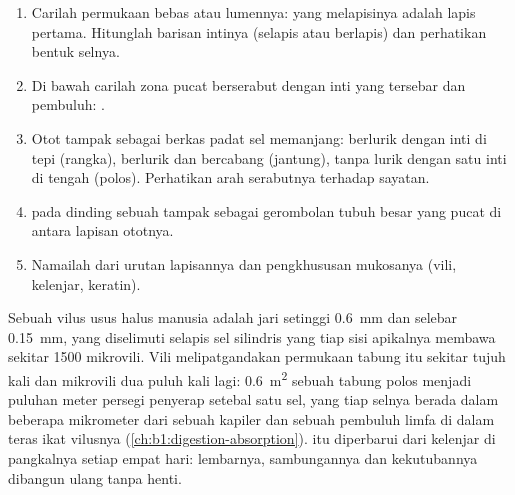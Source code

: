 \begin{method}\label{met:b1:body-plans-tissues:histology}
\begin{enumerate}
  \item Carilah permukaan bebas atau lumennya:  yang melapisinya
        adalah lapis pertama. Hitunglah barisan intinya (selapis atau
        berlapis) dan perhatikan bentuk selnya.
  \item Di bawah  carilah zona pucat berserabut dengan inti yang
        tersebar dan pembuluh: .
  \item Otot tampak sebagai berkas padat sel memanjang: berlurik dengan
        inti di tepi (rangka), berlurik dan bercabang (jantung), tanpa
        lurik dengan satu inti di tengah (polos). Perhatikan arah
        serabutnya terhadap sayatan.
  \item {} pada dinding sebuah  tampak sebagai
        gerombolan tubuh  besar yang pucat di antara lapisan
        ototnya.
  \item Namailah  dari urutan lapisannya dan pengkhususan
        mukosanya (vili, kelenjar, keratin).
\end{enumerate}
\end{method}

\begin{example}\label{ex:b1:body-plans-tissues:villus}
Sebuah vilus usus halus manusia adalah jari setinggi \qty{0.6}{mm} dan
selebar \qty{0.15}{mm}, yang diselimuti selapis sel silindris yang tiap
sisi apikalnya membawa sekitar \qty{1500}{} mikrovili. Vili
melipatgandakan permukaan tabung itu sekitar tujuh kali dan mikrovili
dua puluh kali lagi: \qty{0.6}{m^2} sebuah tabung polos menjadi puluhan
meter persegi  penyerap setebal satu sel, yang tiap selnya berada
dalam beberapa mikrometer dari sebuah kapiler dan sebuah pembuluh limfa
di dalam teras ikat vilusnya (\cref{ch:b1:digestion-absorption}). 
itu diperbarui dari kelenjar di pangkalnya setiap empat hari: lembarnya,
sambungannya dan kekutubannya dibangun ulang tanpa henti.
\end{example}


